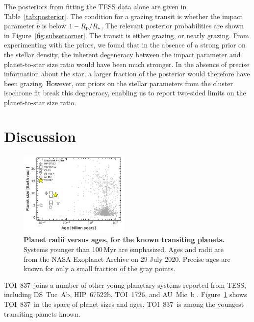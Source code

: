 \documentclass[12pt,twocolumn,tighten]{aastex63}
\newcommand{\tn}{TOI~837} %
\begin{document}
The posteriors from fitting the TESS data alone are given in
Table~\ref{tab:posterior}.  The condition for a grazing transit is
whether the impact parameter $b$ is below $1 - R_{\rm p}/R_\star$.
The relevant posterior probabilities are shown in
Figure~\ref{fig:subsetcorner}.  The transit is either
grazing, or nearly grazing.  From experimenting with the priors, we
found that in the absence of a strong prior on the stellar density,
the inherent degeneracy between the impact parameter and
planet-to-star size ratio would have been much stronger.  In the
absence of precise information about the star, a larger fraction of
the posterior would therefore have been grazing.  However, our priors
on the stellar parameters from the cluster isochrone fit break this
degeneracy, enabling us to report two-sided limits on the
planet-to-star size ratio.




\section{Discussion}
\label{sec:discussion}

\begin{figure}[!t]
	\begin{center}
		\leavevmode
		\includegraphics[width=0.48\textwidth]{f11.pdf}
	\end{center}
	\vspace{-0.6cm}
	\caption{
    {\bf Planet radii versus ages, for the known transiting planets.} 
    Systems younger than 100$\,$Myr are emphasized.  Ages and radii
    are from the NASA Exoplanet Archive on 29 July 2020.  Precise ages
    are known for only a small fraction of the gray points.
		\label{fig:rpvsage}
	}
	\vspace{-0.2cm}
\end{figure}



\tn\ joins a number of other young planetary systems reported from
TESS, including DS~Tuc~Ab, HIP~67522b, TOI~1726, and AU~Mic~b
\citep{newton_tess_2019,zhou_well_2020,montet_young_2020,rizzuto_tess_2020,mann_tess_2020,plavchan_planet_2020,palle_transmission_2020,addison_youngest_2020,martioli_magnetism_2020,hirano_limits_2020}.
Figure~\ref{fig:rpvsage} shows \tn\ in the space of planet sizes and
ages.  \tn\ is among the youngest transiting planets known.  
\end{document}
